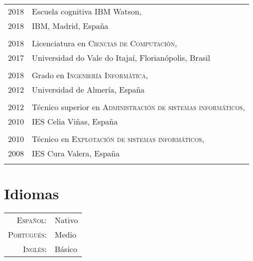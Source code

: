 \documentclass[a4paper,10pt]{article}
\begin{document}
\begin{tabular}{r|p{11cm}}

\textsc {2018} & {Escuela cognitiva IBM Watson}, \\\textsc{2018}& IBM, Madrid, España \normalsize \\\multicolumn{2}{c}{} \\


\textsc {2018} & Licenciatura en \textsc{Ciencias de Computación}, \\\textsc{2017}& {Universidad do Vale do Itajaí}, Florianópolis, Brasil \normalsize \\\multicolumn{2}{c}{} \\

\textsc{2018} & Grado en \textsc{Ingeniería Informática}, \\\textsc{2012} &{Universidad de Almería}, España \normalsize \\\multicolumn{2}{c}{} \\

\textsc 2012 & Técnico superior en \textsc{Administración de sistemas informáticos}, \\\textsc{2010} &{IES Celia Viñas}, España \normalsize \\\multicolumn{2}{c}{} \\

\textsc 2010 & Técnico en \textsc{Explotación de sistemas informáticos}, \\\textsc{2008} &{IES Cura Valera}, España \normalsize \\\multicolumn{2}{c}{} \\

\end{tabular}



\section*{Idiomas}
\begin{tabular}{rp{12cm}}
\textsc{Español:} & Nativo \\
\textsc{Portugués:} & Medio \\
\textsc{Inglés:} & Básico \\


\end{tabular}
\end{document}
